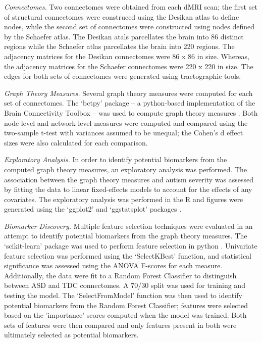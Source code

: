 \documentclass[10pt,conference]{IEEEtran}
\begin{document}
\textit{Connectomes.} Two connectomes were obtained from each dMRI scan; the first set 
of structural connectomes were construced using the Desikan atlas to define nodes, 
while the second set of connectomes were constructed using nodes defined by the 
Schaefer atlas. The Desikan atals parcellates the brain into 86 distinct regions while 
the Schaefer atlas parcellates the brain into 220 regions. The adjacency matrices for 
the Desikan connectomes were 86 x 86 in size. Whereas, the adjacency matrices for the
Schaefer connectomes were 220 x 220 in size. The edges for both sets of connectomes
were generated using tractographic tools.

\textit{Graph Theory Measures.} Several graph theory measures were computed for each set
of connectomes. The `bctpy' package -- a python-based implementation of the Brain 
Connectivity Toolbox -- was used to compute graph theory measures \cite{Rubinov.2010.BCT}. 
Both node-level and network-level measures were computed and compared using the 
two-sample t-test with variances assumed to be unequal; the Cohen's d effect sizes were 
also calculated for each comparison. 

\textit{Exploratory Analysis.} In order to identify potential biomarkers from the computed 
graph theory measures, an exploratory analysis was performed. The association between 
the graph theory measures and autism severity was assessed by fitting the data to 
linear fixed-effects models to account for the effects of any covariates. The exploratory
analysis was performed in the R \cite{R-Core} and figures were generated using the 
`ggplot2' and `ggstatsplot' packages \cite{ggplot2, ggstatsplot}.

\textit{Biomarker Discovery.} Multiple feature selection techniques were evaluated in an 
attempt to identify potential biomarkers from the graph theory measures. The 
`scikit-learn' package was used to perform feature selection in python \cite{sklearn}. 
Univariate feature selection was performed using the `SelectKBest' function, and 
statistical significance was assessed using the ANOVA F-scores for each measure. 
Additionally, the data were fit to a Random Forest Classifier to distinguish between
ASD and TDC connectomes. A 70/30 split was used for training and testing the model.
The `SelectFromModel' function was then used to identify potential biomarkers from the 
Random Forest Classifier; features were selected based on the 'importance' scores computed 
when the model was trained. Both sets of features were then compared and only features 
present in both were ultimately selected as potential biomarkers.
\end{document}
